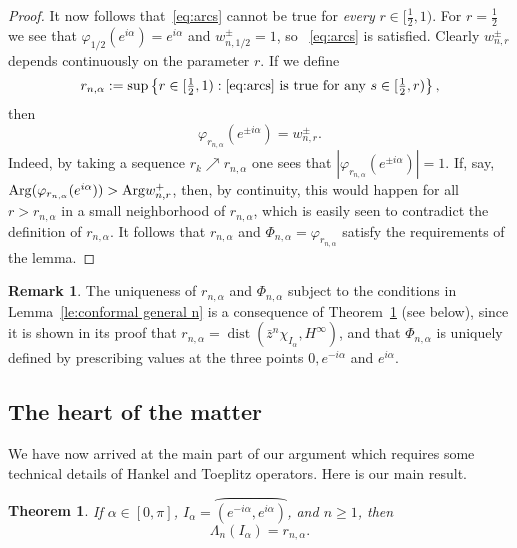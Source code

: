 \documentclass[11pt,reqno]{amsart}
\numberwithin{equation}{section}
\theoremstyle{plain}
\newtheorem{Theorem}[equation]{Theorem}
\theoremstyle{definition}
\newtheorem{Remark}[equation]{Remark}
\begin{document}
\begin{proof}
It now follows that~\eqref{eq:arcs} cannot be true for \emph{every} $r\in [\frac{1}{2}, 1)$. For $r=\tfrac{1}{2}$ we see that ${\varphi}_{1/2}(e^{i\alpha})=e^{i\alpha}$ and $w^\pm_{n,1/2}=1$, so ~\eqref{eq:arcs} is satisfied. Clearly $w^\pm_{n,r}$ depends continuously on the parameter $r$. If we define
\[
r_{n,\alpha}:=\sup\left\{r\in[\tfrac{1}{2}, 1): \text{\eqref{eq:arcs} is true for any $s\in [\tfrac{1}{2}, r)$}\right\},
\]
then 
$${\varphi}_{r_{n,\alpha}}(e^{\pm i\alpha})=w^\pm_{n,r}.$$ Indeed, by taking a sequence $r_k\nearrow r_{n,\alpha}$ one sees that $|{\varphi}_{r_{n,\alpha}}(e^{\pm i\alpha})|=1$. If, say, ${\mathop{\rm Arg}}({\varphi}_{r_{n,\alpha}}(e^{ i\alpha}))>{\mathop{\rm Arg}} w^+_{n,r}$, then, by continuity, this would happen for all $r>r_{n,\alpha}$ in a small neighborhood of $r_{n,\alpha}$, which is easily seen to contradict the definition of $r_{n,\alpha}$. 
It follows that $r_{n,\alpha}$ and 
 $\Phi_{n,\alpha}={\varphi}_{r_{n,\alpha}}$ satisfy the requirements of the lemma.
\end{proof}

\begin{Remark}\label{re:uniqueness r_n}
The uniqueness of $r_{n,\alpha}$ and $\Phi_{n,\alpha}$ subject to the conditions in Lemma~\ref{le:conformal general n} is a consequence of Theorem~\ref{th:lambda_n(interval)} (see below), since it is shown in its proof that $r_{n,\alpha}={\operatorname{dist}}(\bar z^n\chi_{I_{\alpha}}, H^\infty)$, and that $\Phi_{n,\alpha}$ is uniquely defined by prescribing values at the three points $0, e^{-i\alpha}$ and $e^{i \alpha}$. 
\end{Remark}

\subsection{The heart of the matter} We have now arrived at the main part of our argument which requires some technical details of Hankel and Toeplitz operators.  Here is our main result. 

\begin{Theorem}\label{th:lambda_n(interval)}
If $\alpha \in [0, \pi]$, $I_{\alpha} = \wideparen{(e^{-i\alpha}, e^{i\alpha})}$, and  $n \geq 1$, then 
$$\Lambda_n(I_{\alpha})=r_{n,\alpha}.$$
\end{Theorem}
\end{document}

